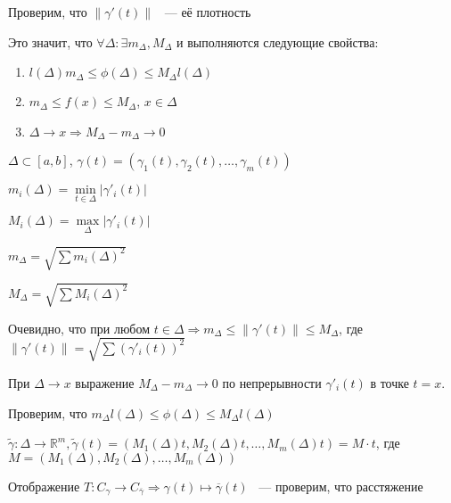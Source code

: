 \documentclass[../main.tex]{subfiles}
\begin{document}
            Проверим, что $\| \gamma'(t) \|$ ~--- её плотность
            
            Это значит, что $\forall \Delta : \exists m_{\Delta}, M_{\Delta}$ и выполняются следующие свойства:
            
            \begin{enumerate}
            
                \item $l(\Delta) m_{\Delta} \leq \phi(\Delta) \leq M_{\Delta} l(\Delta)$
                
                \item $m_{\Delta} \leq f(x) \leq M_{\Delta}$, $x \in \Delta$
                
                \item $\Delta \rightarrow x \Longrightarrow M_{\Delta} - m_{\Delta} \rightarrow 0$
                
            \end{enumerate}
            
            $\Delta \subset [a, b]$, $\gamma(t) = (\gamma_1(t), \gamma_2(t), \ldots, \gamma_m(t))$
            
            $m_i(\Delta) = \min\limits_{t \in \Delta} | \gamma'_i(t) |$
            
            $M_i(\Delta) = \max\limits_{\Delta} |\gamma'_i(t) |$
            
            $m_{\Delta} = \sqrt{\sum m_i(\Delta)^2}$
            
            $M_{\Delta} = \sqrt{\sum M_i(\Delta)^2}$
            
            Очевидно, что при любом $t \in \Delta \Longrightarrow m_{\Delta} \leq \| \gamma'(t) \|  \leq M_{\Delta}$, где $\| \gamma'(t) \| = \sqrt{\sum(\gamma'_i(t))^2}$
            
            При $\Delta \rightarrow x$ выражение $M_{\Delta} - m_{\Delta} \rightarrow 0$ по непрерывности $\gamma'_i(t)$ в точке $t = x$.
            
            Проверим, что $m_{\Delta} l(\Delta) \leq \phi(\Delta) \leq M_{\Delta} l(\Delta)$
            
            $\widetilde{\gamma} : \Delta \rightarrow \mathbb{R}^m, \widetilde{\gamma}(t) = \left(M_1(\Delta)t, M_2(\Delta)t, \ldots, M_m(\Delta)t\right) = M \cdot t$, где $M = (M_1(\Delta), M_2(\Delta), \ldots, M_m(\Delta) )$
            
            Отображение $T : C_{\gamma} \rightarrow C_{\overline{\gamma}} \Longrightarrow \gamma(t) \mapsto \overline{\gamma}(t)$ ~--- проверим, что расстяжение
            
\end{document}
